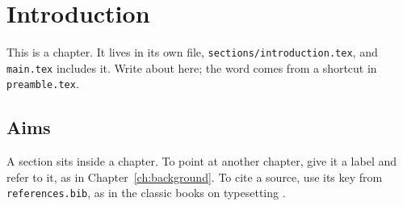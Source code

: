\chapter{Introduction}
\label{ch:introduction}

This is a chapter. It lives in its own file, \texttt{sections/introduction.tex}, and
\texttt{main.tex} includes it. Write about \topic{} here; the word comes from a shortcut in
\texttt{preamble.tex}.

\section{Aims}

A section sits inside a chapter. To point at another chapter, give it a label and refer to it,
as in Chapter~\ref{ch:background}. To cite a source, use its key from \texttt{references.bib},
as in the classic books on typesetting \cite{knuth1984,lamport1994}.
